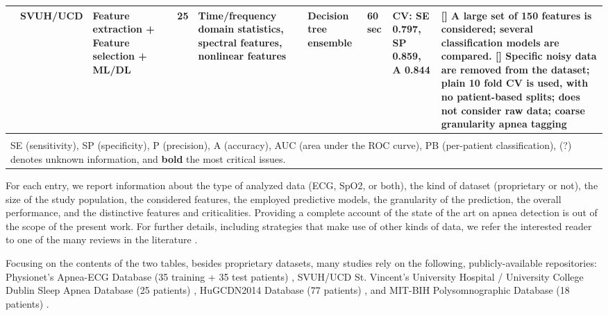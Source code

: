 \documentclass[5p,twocolumn,lefttitle]{elsarticle}
\begin{document}
\begin{table*}[t]
{\begin{tabularx}{2\textwidth}{@{}m{2.5em}p{7em}p{10em}lp{2em}p{12em}p{7em}p{3em}p{17em}X@{}}
                            & SVUH/UCD                                                & Feature extraction + Feature selection + ML/DL                 & \cite{xie2012real}                       & 25            & Time/frequency domain statistics, spectral features, nonlinear features                                           & Decision tree ensemble              & 60 sec                                     & CV: SE 0.797, SP 0.859, A 0.844                                                                                                                                                       & [] A large set of 150 features is considered; several classification models are compared. [] \textbf{Specific noisy data are removed from the dataset}; \textbf{plain 10 fold CV is used, with no patient-based splits}; does not consider raw data; coarse granularity apnea tagging                                                                                                                                                                         \\
                            \bottomrule \\
\multicolumn{10}{l}{\large SE (sensitivity), SP (specificity), P (precision), A (accuracy), AUC (area under the ROC curve), PB (per-patient classification), (?) denotes unknown information, and \textbf{bold} the most critical issues.}
\end{tabularx}}
\end{table*}

For each entry, we report information about the type of analyzed data (ECG, SpO2, or both), the kind of dataset (proprietary or not), the size of the study population, the considered features, the employed predictive models, the granularity of the prediction, the overall performance, and the distinctive features and criticalities.  
Providing a complete account of the state of the art on apnea detection is out of the scope of the present work. For further details, including strategies that make use of other kinds of data, we refer the interested reader to one of the many reviews in the literature \cite{mostafa2019systematic,mendonca2018review,hassan2015comparative,pombo2017classification,gutierrez2021reliability}.

Focusing on the contents of the two tables, besides proprietary datasets, many studies rely on the following, publicly-available repositories: Physionet’s Apnea-ECG Database (35 training + 35 test patients) \cite{penzel2000apnea}, SVUH/UCD St. Vincent's University Hospital / University College Dublin Sleep Apnea Database (25 patients) \cite{heneghan2011st}, HuGCDN2014 Database (77 patients) \cite{huyygg}, and MIT-BIH Polysomnographic Database (18 patients) \cite{ichimaru1999development}.
\end{document}
